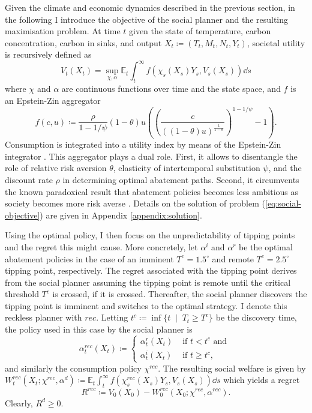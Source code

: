 \documentclass[../../main.tex]{subfiles}
\begin{document}
Given the climate and economic dynamics described in the previous section, in the following I introduce the objective of the social planner and the resulting maximisation problem. At time $t$ given the state of temperature, carbon concentration, carbon in sinks, and output $X_t \coloneqq (T_t, M_t, N_t, Y_t)$, societal utility is recursively defined as \begin{equation} \label{eq:social-objective}
    V_t(X_t) = \sup_{\chi, \alpha} \mathbb{E}_t 
    \int_{t}^{\infty} f(\chi_s(X_s) Y_s, V_s(X_s)) \dd{s}
\end{equation} where $\chi$ and $\alpha$ are continuous functions over time and the state space, and $f$ is an Epstein-Zin aggregator \begin{equation} \label{eq:aggregator}
    f(c, u) \coloneqq \frac{\rho}{1 - 1 / \psi} (1 - \theta) u  \left( \left(\frac{c}{((1 - \theta) u)^{\frac{1}{1 - \theta}}}\right)^{1 - 1 / \psi} - 1 \right).
\end{equation} Consumption is integrated into a utility index by means of the Epstein-Zin integrator \citep{duffie_asset_1992}. This aggregator plays a dual role. First, it allows to disentangle the role of relative risk aversion $\theta$, elasticity of intertemporal substitution $\psi$, and the discount rate $\rho$ in determining optimal abatement paths. Second, it circumvents the known paradoxical result that abatement policies becomes less ambitious as society becomes more risk averse \citep{pindyck_economic_2013}. Details on the solution of problem (\ref{eq:social-objective}) are given in Appendix \ref{appendix:solution}. 

Using the optimal policy, I then focus on the unpredictability of tipping points and the regret this might cause. More concretely, let $\alpha^{i}$ and $\alpha^{r}$ be the optimal abatement policies in the case of an imminent $T^c = 1.5^\circ$ and remote $T^c = 2.5^\circ$ tipping point, respectively. The regret associated with the tipping point derives from the social planner assuming the tipping point is remote until the critical threshold $T^c$ is crossed, if it is crossed. Thereafter, the social planner discovers the tipping point is imminent and switches to the optimal strategy. I denote this reckless planner with $rec$. Letting $t^c \coloneqq \inf\{t \; \mid \; T_t \geq T^c \}$ be the discovery time, the policy used in this case by the social planner is \begin{equation}
    \alpha^{rec}_t(X_t) \coloneqq \begin{cases}
        \alpha_t^r(X_t) &\text{ if } t < t^c \text{ and } \\
        \alpha_t^i(X_t) &\text{ if } t \geq t^c,
    \end{cases}
\end{equation} and similarly the consumption policy $\chi^{rec}$. The resulting social welfare is given by  $W^{rec}_t(X_t; \chi^{rec}, \alpha^d) \coloneqq \mathbb{E}_t \int_{t}^{\infty} f(\chi^{rec}_s(X_s) Y_s, V_s(X_s)) \dd{s}$ which yields a regret \begin{equation}
    R^{rec} \coloneqq V_0(X_0) - W^{rec}_0(X_0; \chi^{rec}, \alpha^{rec}).
\end{equation} Clearly, $R^d \geq 0$. 
\end{document}
